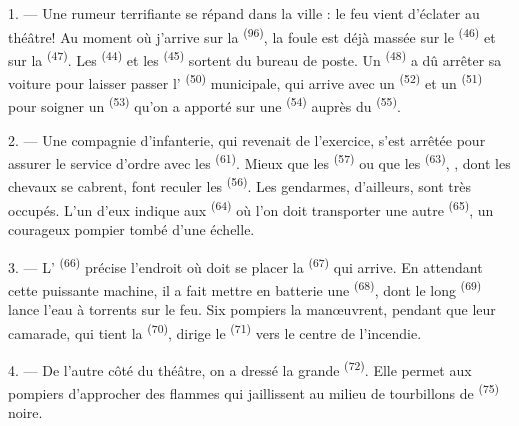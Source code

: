 \VUsaut{5.0mm}
\VUsaut{3.0mm}

\VUsaut{3.4mm}

1. --- Une rumeur terrifiante se répand dans la ville : le feu vient d'éclater
au théâtre! Au moment où j'arrive sur la  \textsuperscript{(96)},
la foule est déjà massée sur le  \textsuperscript{(46)} et sur
la  \textsuperscript{(47)}. Les 
\textsuperscript{(44)} et les  \textsuperscript{(45)} sortent du
bureau de poste. Un  \textsuperscript{(48)} a dû
arrêter sa voiture pour laisser passer l'
\textsuperscript{(50)} municipale, qui arrive avec un 
\textsuperscript{(52)} et un  \textsuperscript{(51)} pour
soigner un  \textsuperscript{(53)} qu'on a apporté sur une
 \textsuperscript{(54)} auprès du 
\textsuperscript{(55)}.

2. --- Une compagnie d'infanterie, qui revenait de l'exercice, s'est arrêtée
pour assurer le service d'ordre avec les 
\textsuperscript{(61)}. Mieux que les 
\textsuperscript{(57)} ou que les  \textsuperscript{(63)},
, dont les chevaux se cabrent, font reculer les
 \textsuperscript{(56)}. Les gendarmes, d'ailleurs, sont très occupés. L'un
d'eux indique aux  \textsuperscript{(64)} où l'on doit
transporter une autre  \textsuperscript{(65)}, un courageux
pompier tombé d'une échelle.

3. --- L' \textsuperscript{(66)} précise l'endroit où doit se
placer la  \textsuperscript{(67)} qui arrive. En
attendant cette puissante machine, il a fait mettre en batterie une
 \textsuperscript{(68)}, dont le long 
\textsuperscript{(69)} lance l'eau à torrents sur le feu. Six pompiers la
manœuvrent, pendant que leur camarade, qui tient la 
\textsuperscript{(70)}, dirige le  \textsuperscript{(71)} vers le
centre de l'incendie.

4. --- De l'autre côté du théâtre, on a dressé la grande 
\textsuperscript{(72)}. Elle permet aux pompiers d'approcher des flammes qui
jaillissent au milieu de tourbillons de  \textsuperscript{(75)}
noire.

